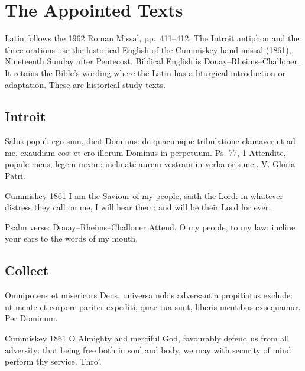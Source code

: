 \clearpage
\section{The Appointed Texts}
Latin follows the 1962 Roman Missal, pp.~411--412. The Introit antiphon and the three orations use the historical English of the Cummiskey hand missal (1861), Nineteenth Sunday after Pentecost. Biblical English is Douay--Rheims--Challoner. It retains the Bible's wording where the Latin has a liturgical introduction or adaptation. These are historical study texts.

\subsection{Introit}\label{proper-introit}
\begin{latinproper}
Salus populi ego sum, dicit Dominus: de quacumque tribulatione clamaverint ad me, exaudiam eos: et ero illorum Dominus in perpetuum. Ps. 77, 1 Attendite, popule meus, legem meam: inclinate aurem vestram in verba oris mei. V. Gloria Patri.
\end{latinproper}
\begin{englishwitness}{Cummiskey 1861}
I am the Saviour of my people, saith the Lord: in whatever distress they call on me, I will hear them: and will be their Lord for ever.
\end{englishwitness}
\begin{englishwitness}{Psalm verse: Douay--Rheims--Challoner}
Attend, O my people, to my law: incline your ears to the words of my mouth.
\end{englishwitness}

\subsection{Collect}\label{proper-collect}
\begin{latinproper}
Omnipotens et misericors Deus, universa nobis adversantia propitiatus exclude: ut mente et corpore pariter expediti, quae tua sunt, liberis mentibus exsequamur. Per Dominum.
\end{latinproper}
\begin{englishwitness}{Cummiskey 1861}
O Almighty and merciful God, favourably defend us from all adversity: that being free both in soul and body, we may with security of mind perform thy service. Thro’.
\end{englishwitness}

